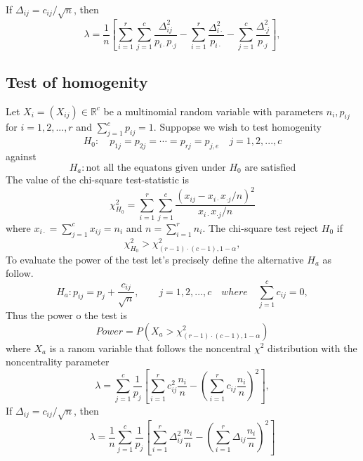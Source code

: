 \documentclass{article}
\begin{document}
If $\Delta_{ij} = c_{ij}/\sqrt{n}$, then 
\begin{equation}
    \lambda = \frac{1}{n}\left[\sum_{i=1}^{r}\sum_{j=1}^c \frac{\Delta_{ij}^2}{p_{i\cdot}p_{\cdot j}} - \sum_{i=1}^{r}\frac{\Delta_{i \cdot}^2}{p_{i \cdot}} - \sum_{j=1}^{c}\frac{\Delta_{\cdot j}^2}{p_{\cdot j}}\right],
\end{equation}



\subsection{Test of homogenity}
Let $X_i=(X_{ij}) \in \mathbb{R}^{c}$ be a multinomial random variable with
parameters $n_{i},p_{ij}$ for $i=1,2,...,r$ and $\sum_{j=1}^cp_{ij}=1$. 
Suppopse we wish to test homogenity
\begin{equation}
    H_0: \quad p_{1j}=p_{2j}=\cdots = p_{rj} = p_{j,e}\quad j=1,2,...,c
\end{equation}
against
\begin{equation}
    H_a: \mbox{not all the equatons given under $H_0$ are satisfied}
\end{equation}
The value of the chi-square test-statistic is
\begin{equation}
    \chi^2_{H_0} = \sum_{i=1}^r\sum_{j=1}^c \frac{\left(x_{ij} - x_{i \cdot}x_{\cdot j}/n\right)^2}{x_{i \cdot}x_{\cdot j}/n}
\end{equation}
where $x_{i \cdot} = \sum_{j=1}^c x_{ij} = n_{i}$ and $n = \sum_{i=1}^r n_{i}$.
The chi-square test reject $H_0$ if
\begin{equation}
    \chi^2_{H_0} > \chi^2_{(r-1)\cdot(c-1),1-\alpha},
\end{equation}
To evaluate the power of the test let's precisely define the alternative $H_a$ as follow.
\begin{equation}
    H_a: p_{ij} = p_{j} + \frac{c_{ij}}{\sqrt{n}}, \qquad j=1,2,...,c \quad where \quad \sum_{j=1}^{c}c_{ij}=0, 
\end{equation}
Thus the power o the test is
\begin{equation}
    Power = P\left(X_a > \chi^2_{(r-1)\cdot(c-1),1-\alpha}\right)
\end{equation}
where $X_a$ is a ranom variable that follows the noncentral $\chi^2$ distribution with the noncentrality parameter
\begin{equation}
    \lambda = \sum_{j=1}^{c}\frac{1}{p_j}\left[ \sum_{i=1}^{r} c_{ij}^2 \frac{n_i}{n} -  \left(\sum_{i=1}^{r} c_{ij} \frac{n_i}{n}\right)^2  \right],
\end{equation}
If $\Delta_{ij} = c_{ij}/\sqrt{n}$, then 
\begin{equation}
    \lambda = \frac{1}{n}\sum_{j=1}^{c}\frac{1}{p_j}\left[ \sum_{i=1}^{r} \Delta_{ij}^2 \frac{n_i}{n} -  \left(\sum_{i=1}^{r} \Delta_{ij} \frac{n_i}{n}\right)^2  \right]
\end{equation}
\end{document}

